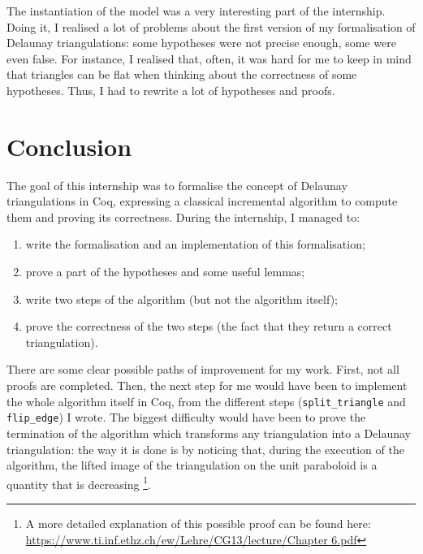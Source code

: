 \documentclass[a4paper,10pt]{article}
\begin{document}
  The instantiation of the model was a very interesting part of the internship. Doing it, I realised a lot of problems about the first version of my formalisation of Delaunay triangulations: some hypotheses were not precise enough, some were even false. For instance, I realised that, often, it was hard for me to keep in mind that triangles can be flat when thinking about the correctness of some hypotheses. Thus, I had to rewrite a lot of hypotheses and proofs.

\section{Conclusion}
The goal of this internship was to formalise the concept of Delaunay triangulations in {\sc Coq}, expressing a classical incremental algorithm to compute them and proving its correctness. During the internship, I managed to:
\begin{enumerate}
\item write the formalisation and an implementation of this formalisation;
\item prove a part of the hypotheses and some useful lemmas;
\item write two steps of the algorithm (but not the algorithm itself);
\item prove the correctness of the two steps (the fact that they return a correct triangulation).
\end{enumerate}

There are some clear possible paths of improvement for my work. First, not all proofs are completed. Then, the next step for me would have been to implement the whole algorithm itself in {\sc Coq}, from the different steps ({\tt split\_triangle} and {\tt flip\_edge}) I wrote. The biggest difficulty would have been to prove the termination of the algorithm which transforms any triangulation into a Delaunay triangulation: the way it is done is by noticing that, during the execution of the algorithm, the lifted image of the triangulation on the unit paraboloid is a quantity that is decreasing \cite{Bertot}\footnote{A more detailed explanation of this possible proof can be found here:
\href{https://www.ti.inf.ethz.ch/ew/Lehre/CG13/lecture/Chapter 6.pdf}{https://www.ti.inf.ethz.ch/ew/Lehre/CG13/lecture/Chapter 6.pdf}}.
\end{document}
